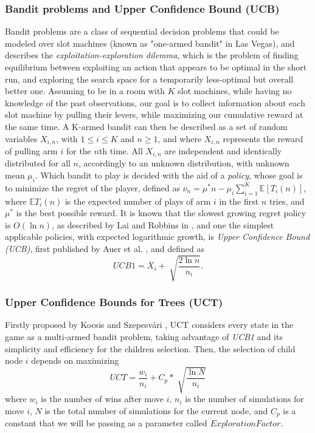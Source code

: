 \subsubsection*{Bandit problems and Upper Confidence Bound (UCB)}
Bandit problems are a class of sequential decision problems that could be modeled over slot machines (known as "one-armed bandit" in Las Vegas), and describes the \emph{exploitation-exploration dilemma}, which is the problem of finding equilibrium between exploiting an action that appears to be optimal in the short run, and exploring the search space for a temporarily less-optimal but overall better one. Assuming to be in a room with $K$ slot machines, while having no knowledge of the past observations, our goal is to collect information about each slot machine by pulling their levers, while maximizing our cumulative reward at the same time. A K-armed bandit can then be described as a set of random variables $X_{i,n}$, with $1\leq i \leq K$ and $n\geq1$, and where $X_{i, n}$ represents the reward of pulling arm $i$ for the $n$th time. All $X_{i,n}$ are independent and identically distributed for all $n$, accordingly to an unknown distribution, with unknown mean $\mu_i$. Which bandit to play is decided with the aid of a \emph{policy}, whose goal is to minimize the regret of the player, defined as $\nu_n = \mu^*n-\mu_i \sum_{i=1}^{K}\mathbb{E}[T_i(n)]$, where $\mathbb{E}T_i(n)$ is the expected number of plays of arm $i$ in the first $n$ tries, and $\mu^*$ is the best possible reward\cite{browne2012survey,auer2002finite,kocsis2006bandit,kocsis2006improved,shivaswamy2012multi}. It is known that the slowest growing regret policy is $O(\ln n)$, as described by Lai and Robbins in \cite{lai1985asymptotically}, and one the simplest applicable policies, with expected logarithmic growth, is \emph{Upper Confidence Bound (UCB)}, first published by Auer et al. \cite{auer2002finite}, and defined as $$UCB1 = \overline{X}_i + \sqrt[]{\frac{2\ln n}{n_i}}.$$
\subsubsection*{Upper Confidence Bounds for Trees (UCT)}
Firstly proposed by Kocsis and Szepesvári \cite{kocsis2006bandit,kocsis2006improved}, UCT considers every state in the game as a multi-armed bandit problem, taking advantage of \emph{UCB1} and its simplicity and efficiency for the children selection. Then, the selection of child node $i$ depends on maximizing $$UCT = \frac{w_i}{n_i}+C_p*\sqrt[]{\frac{\ln N}{n_i}}$$ where $w_i$ is the number of wins after move $i$, $n_i$ is the number of simulations for move $i$, $N$ is the total number of simulations for the current node, and $C_p$ is a constant that we will be passing as a parameter called $ExplorationFactor$.
